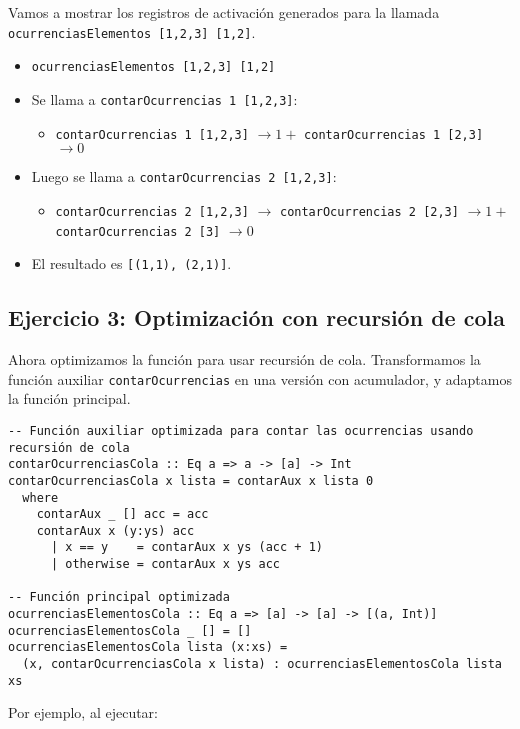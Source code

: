 \documentclass{article}
\begin{document}
Vamos a mostrar los registros de activación generados para la llamada \texttt{ocurrenciasElementos [1,2,3] [1,2]}.

\begin{itemize}
  \item \texttt{ocurrenciasElementos [1,2,3] [1,2]}
  \item Se llama a \texttt{contarOcurrencias 1 [1,2,3]}:
    \begin{itemize}
      \item \texttt{contarOcurrencias 1 [1,2,3]} $\rightarrow 1 +$ \texttt{contarOcurrencias 1 [2,3]} $\rightarrow 0$
    \end{itemize}
  \item Luego se llama a \texttt{contarOcurrencias 2 [1,2,3]}:
    \begin{itemize}
      \item \texttt{contarOcurrencias 2 [1,2,3]} $\rightarrow$ \texttt{contarOcurrencias 2 [2,3]} $\rightarrow 1 +$ \texttt{contarOcurrencias 2 [3]} $\rightarrow 0$
    \end{itemize}
  \item El resultado es \texttt{[(1,1), (2,1)]}.
\end{itemize}

\subsection{Ejercicio 3: Optimización con recursión de cola}

Ahora optimizamos la función para usar recursión de cola. Transformamos la función auxiliar \texttt{contarOcurrencias} en una versión con acumulador, y adaptamos la función principal.

\begin{lstlisting}
-- Función auxiliar optimizada para contar las ocurrencias usando recursión de cola
contarOcurrenciasCola :: Eq a => a -> [a] -> Int
contarOcurrenciasCola x lista = contarAux x lista 0
  where
    contarAux _ [] acc = acc
    contarAux x (y:ys) acc
      | x == y    = contarAux x ys (acc + 1)
      | otherwise = contarAux x ys acc

-- Función principal optimizada
ocurrenciasElementosCola :: Eq a => [a] -> [a] -> [(a, Int)]
ocurrenciasElementosCola _ [] = []
ocurrenciasElementosCola lista (x:xs) = 
  (x, contarOcurrenciasCola x lista) : ocurrenciasElementosCola lista xs
\end{lstlisting}

Por ejemplo, al ejecutar:
\end{document}
